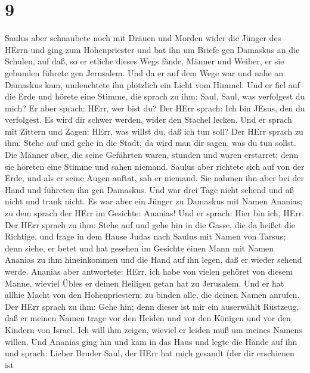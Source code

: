 \hypertarget{section-8}{%
\section{9}\label{section-8}}

 Saulus aber schnaubete noch mit Dräuen und Morden wider die
Jünger des HErrn und ging zum Hohenpriester  und bat ihn um
Briefe gen Damaskus an die Schulen, auf daß, so er etliche dieses Wegs
fände, Männer und Weiber, er sie gebunden führete gen Jerusalem.
 Und da er auf dem Wege war und nahe an Damaskus kam,
umleuchtete ihn plötzlich ein Licht vom Himmel.  Und er fiel
auf die Erde und hörete eine Stimme, die sprach zu ihm: Saul, Saul, was
verfolgest du mich?  Er aber sprach: HErr, wer bist du? Der
HErr sprach: Ich bin JEsus, den du verfolgest. Es wird dir schwer
werden, wider den Stachel lecken.  Und er sprach mit Zittern
und Zagen: HErr, was willst du, daß ich tun soll? Der HErr sprach zu
ihm: Stehe auf und gehe in die Stadt; da wird man dir sagen, was du tun
sollst.  Die Männer aber, die seine Gefährten waren, stunden
und waren erstarret; denn sie höreten eine Stimme und sahen niemand.
 Saulus aber richtete sich auf von der Erde, und als er
seine Augen auftat, sah er niemand. Sie nahmen ihn aber bei der Hand und
führeten ihn gen Damaskus.  Und war drei Tage nicht sehend
und aß nicht und trank nicht.  Es war aber ein Jünger zu
Damaskus mit Namen Ananias; zu dem sprach der HErr im Gesichte: Ananias!
Und er sprach: Hier bin ich, HErr.  Der HErr sprach zu ihm:
Stehe auf und gehe hin in die Gasse, die da heißet die Richtige, und
frage in dem Hause Judas nach Saulus mit Namen von Tarsus; denn siehe,
er betet  und hat gesehen im Gesichte einen Mann mit Namen
Ananias zu ihm hineinkommen und die Hand auf ihn legen, daß er wieder
sehend werde.  Ananias aber antwortete: HErr, ich habe von
vielen gehöret von diesem Manne, wieviel Übles er deinen Heiligen getan
hat zu Jerusalem.  Und er hat allhie Macht von den
Hohenpriestern; zu binden alle, die deinen Namen anrufen. 
Der HErr sprach zu ihm: Gehe hin; denn dieser ist mir ein auserwählt
Rüstzeug, daß er meinen Namen trage vor den Heiden und vor den Königen
und vor den Kindern von Israel.  Ich will ihm zeigen,
wieviel er leiden muß um meines Namens willen.  Und Ananias
ging hin und kam in das Haus und legte die Hände auf ihn und sprach:
Lieber Bruder Saul, der HErr hat mich gesandt (der dir erschienen ist
